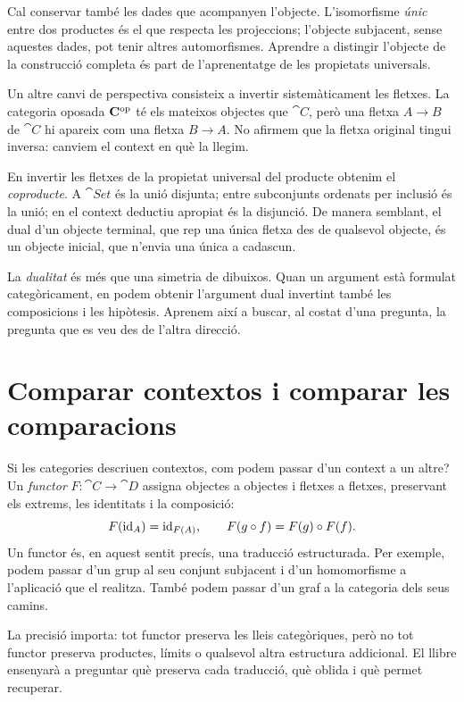 Cal conservar també les dades que acompanyen l'objecte. L'isomorfisme
\emph{únic} entre dos productes és el que respecta les projeccions;
l'objecte subjacent, sense aquestes dades, pot tenir altres automorfismes.
Aprendre a distingir l'objecte de la construcció completa és part de
l'aprenentatge de les propietats universals.

Un altre canvi de perspectiva consisteix a invertir sistemàticament les
fletxes. La categoria oposada $\mathbf{C}^{\mathrm{op}}$ té els mateixos
objectes que $\cat{C}$, però una fletxa $A\to B$ de $\cat{C}$ hi apareix
com una fletxa $B\to A$. No afirmem que la fletxa original tingui inversa:
canviem el context en què la llegim.

En invertir les fletxes de la propietat universal del producte obtenim
el \emph{coproducte}. A $\cat{Set}$ és la unió disjunta; entre subconjunts
ordenats per inclusió és la unió; en el context deductiu apropiat és la
disjunció. De manera semblant, el dual d'un objecte terminal, que rep una
única fletxa des de qualsevol objecte, és un objecte inicial, que n'envia
una única a cadascun.

La \emph{dualitat} és més que una simetria de dibuixos. Quan un argument
està formulat categòricament, en podem obtenir l'argument dual invertint
també les composicions i les hipòtesis. Aprenem així a buscar, al costat
d'una pregunta, la pregunta que es veu des de l'altra direcció.

\section{Comparar contextos i comparar les comparacions}

Si les categories descriuen contextos, com podem passar d'un context a
un altre? Un \emph{functor} $F\colon\cat{C}\to\cat{D}$ assigna objectes
a objectes i fletxes a fletxes, preservant els extrems, les identitats i
la composició:
\[
  F(\operatorname{id}_A)=\operatorname{id}_{F(A)},
  \qquad F(g\circ f)=F(g)\circ F(f).
\]
Un functor és, en aquest sentit precís, una traducció estructurada.
Per exemple, podem passar d'un grup al seu conjunt subjacent i d'un
homomorfisme a l'aplicació que el realitza. També podem passar d'un graf
a la categoria dels seus camins.

La precisió importa: tot functor preserva les lleis categòriques, però
no tot functor preserva productes, límits o qualsevol altra estructura
addicional. El llibre ensenyarà a preguntar què preserva cada traducció,
què oblida i què permet recuperar.

